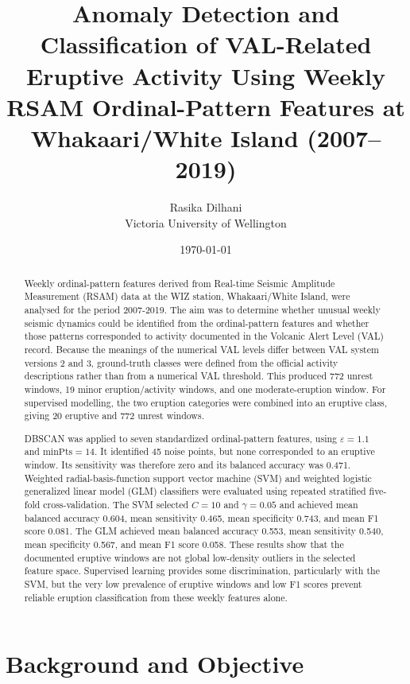 \documentclass[11pt]{article}
\title{Anomaly Detection and Classification of VAL-Related Eruptive Activity Using Weekly RSAM Ordinal-Pattern Features at Whakaari/White Island (2007--2019)}
\author{Rasika Dilhani \\ Victoria University of Wellington}
\date{\today}
\begin{document}
	
	\maketitle
	
	\begin{abstract}
		Weekly ordinal-pattern features derived from Real-time Seismic Amplitude 		Measurement (RSAM) data at the WIZ station, Whakaari/White Island, were 		analysed for the period 2007-2019. The aim was to determine whether unusual 
		weekly seismic dynamics could be identified from the ordinal-pattern features
		and whether those patterns corresponded to activity documented in the
		Volcanic Alert Level (VAL) record. Because the meanings of the numerical VAL
		levels differ between VAL system versions 2 and 3, ground-truth classes were
		defined from the official activity descriptions rather than from a numerical
		VAL threshold. This produced 772 unrest windows, 19 minor eruption/activity
		windows, and one moderate-eruption window. For supervised modelling, the two
		eruption categories were combined into an eruptive class, giving 20 eruptive
		and 772 unrest windows.
		
		DBSCAN was applied to seven standardized ordinal-pattern features, using
		$\varepsilon=1.1$ and $\mathrm{minPts}=14$. It identified 45 noise points, but
		none corresponded to an eruptive window. Its sensitivity was therefore zero
		and its balanced accuracy was 0.471. Weighted radial-basis-function support
		vector machine (SVM) and weighted logistic generalized linear model (GLM)
		classifiers were evaluated using repeated stratified five-fold
		cross-validation. The SVM selected $C=10$ and $\gamma=0.05$ and achieved mean
		balanced accuracy 0.604, mean sensitivity 0.465, mean specificity 0.743, and
		mean F1 score 0.081. The GLM achieved mean balanced accuracy 0.553, mean
		sensitivity 0.540, mean specificity 0.567, and mean F1 score 0.058. These
		results show that the documented eruptive windows are not global
		low-density outliers in the selected feature space. Supervised learning
		provides some discrimination, particularly with the SVM, but the very low
		prevalence of eruptive windows and low F1 scores prevent reliable eruption
		classification from these weekly features alone.
	\end{abstract}
	
\section{Background and Objective}
\end{document}
